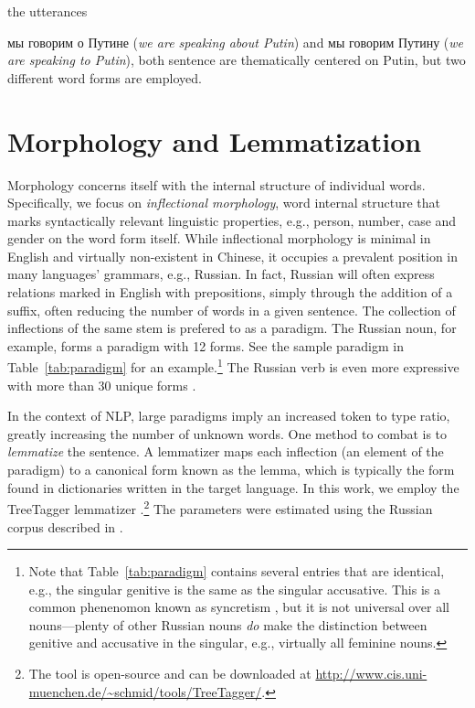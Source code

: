 \documentclass[11pt,letterpaper]{article}
\newcommand{\Note}[3]{\sethlcolor{#2}\hl{[\textbf{#1}: #3]}}
\renewcommand{\Note}[3]{}
\newcommand{\ryan}[1]{\Note{ryan}{lightorange}{#1}}
\newcommand{\chandler}[1]{\Note{chandler}{pink}{#1}}
\begin{document}
the utterances {{мы говорим о Путине} ({\em we
    are speaking about Putin}) and {{мы
      говорим Путину} ({\em we are speaking to Putin})}, both sentence
  are thematically centered on Putin, but two different word forms
  are employed.

  \ryan{Make connection here to stop words. We filter stop words (or try to) in topic models, so we should
    filter these endings as well?}
\chandler{I don't understand, what is the connection to stop words?}
\ryan{English stop words like prepositions are often inflectional suffixes in Russian. In a sense, lemmatization is analogus to filtering stop words. Consider
the Putin example: ``to'' is a stop word, but that is fully expressed by a suffix in Russian.}

\section{Morphology and Lemmatization}\label{sec:inflectional}

Morphology concerns itself with the internal structure of individual
words.  Specifically, we focus on {\em inflectional morphology}, word
internal structure that marks syntactically relevant linguistic
properties, e.g., person, number, case and gender on the word form
itself. While inflectional morphology is minimal in English and
virtually non-existent in Chinese, it occupies a prevalent position in
many languages' grammars, e.g., Russian. In fact, Russian will often
express relations marked in English with prepositions, simply through
the addition of a suffix, often reducing the number of words in a
given sentence. The collection of inflections of the same stem is prefered to as a
paradigm.  The Russian noun, for example, forms a paradigm with 12
forms.  See the sample paradigm in Table~\ref{tab:paradigm} for an
example.\footnote{Note that Table~\ref{tab:paradigm} contains several
  entries that are identical, e.g., the singular genitive is the same
  as the singular accusative. This is a common phenenomon known as
  syncretism \cite{baerman2005syntax}, but it is not universal over all nouns---plenty of other
  Russian nouns {\em do} make the distinction between
  genitive and accusative in the singular, e.g., virtually all
  feminine nouns.} The Russian verb is even more expressive with more
than 30 unique forms \cite{wade2010comprehensive}.

In the context of NLP, large paradigms imply an increased token to type
ratio, greatly increasing the number of unknown words. One method to
combat is to {\em lemmatize} the sentence.  A lemmatizer maps each
inflection (an element of the paradigm) to a canonical form known as
the lemma, which is typically the form found in dictionaries written
in the target language. In this work, we employ the TreeTagger
lemmatizer \cite{schmid1994probabilistic}.\footnote{The tool is
    open-source and can be downloaded at
    \url{http://www.cis.uni-muenchen.de/~schmid/tools/TreeTagger/}.
}
The parameters were estimated using the Russian corpus described in
.

}
\end{document}
